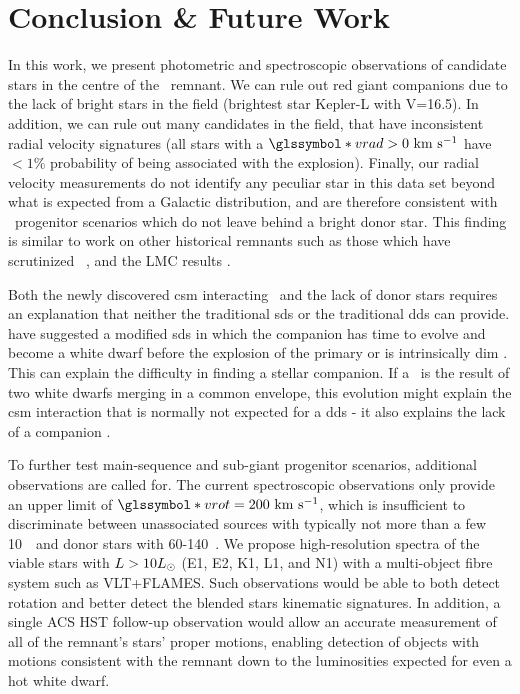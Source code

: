 \documentclass[preprint2]{aastex}
\begin{document}



\section{Conclusion \& Future Work}

\label{sec:conclusion}

In this work, we present photometric and spectroscopic observations of candidate stars in the centre of the \ remnant. We can rule out red giant companions due to the lack of bright stars in the field (brightest star Kepler-L with V=16.5). In addition, we can rule out many candidates in the field, that have inconsistent radial velocity signatures (all stars with a $\vrad>0~\kms$ have $< 1\%$ probability of being associated with the explosion). Finally, our radial velocity measurements do not identify any peculiar star in this data set beyond what is expected from a Galactic distribution, and are therefore consistent with \snia\ progenitor scenarios which do not leave behind a bright donor star. This finding is similar to work on other historical remnants such as those which have scrutinized \ \citep{2012Natur.489..533G,2012ApJ...759....7K}, and the LMC results \citep{2012ApJ...747L..19E, 2012Natur.481..164S}. 

Both the newly discovered \gls{csm} interacting \sneia\ and the lack of donor stars requires an explanation that neither the traditional \gls{sds} or the traditional \gls{dds} can provide. \citet{2011ApJ...730L..34J,2011ApJ...738L...1D,2012ApJ...744...69H,2012ApJ...756L...4H} have suggested a modified \gls{sds} in which the companion has time to evolve and become a white dwarf before the explosion of the primary or is intrinsically dim \citep{2012ApJ...758..123W}. This can explain the difficulty in finding a stellar companion. If a \snia\ is the result of two white dwarfs merging in a common envelope, this evolution might explain the \gls{csm} interaction that is normally not expected for a \gls{dds} - it also explains the lack of a companion \citep[][van Kerkwijk priv. comm. ]{2011MNRAS.417.1466K}.  

To further test main-sequence and sub-giant progenitor scenarios, additional observations are called for. The current spectroscopic observations only provide an upper limit of $\vrot=200~\kms$, which is insufficient to discriminate between unassociated sources with typically not more than a few 10~\kms\ and donor stars with 60-140~\kms \citep[see Figure~4 in ][]{2012ApJ...759....7K}. We propose high-resolution spectra of the viable stars with $L>10\hbox{$L_{\odot}$}$ (E1, E2, K1, L1, and N1) with a multi-object fibre system such as VLT+FLAMES. Such observations would be able to both detect rotation and better detect the blended stars kinematic signatures. In addition, a single ACS HST follow-up observation would allow an accurate measurement of all of the remnant's stars' proper motions, enabling detection of objects with motions consistent with the remnant down to the luminosities expected for even a hot white dwarf. 
\end{document}
